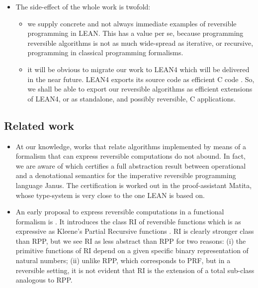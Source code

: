 \documentclass[runningheads]{llncs}
\newcommand{\RPP}{\textsf{RPP}\xspace}
\newcommand{\PRF}{\textsf{PRF}\xspace}
\newcommand{\CPP}{\textsf{C}\xspace}
\newcommand{\LEAN}{\textsf{LEAN}\xspace}
\newcommand{\LEANFour}{\textsf{LEAN4}\xspace}
\newcommand{\JMF}{\textsf{RI}\xspace} %
\newcommand{\Janus}{\textsf{Janus}\xspace}
\newcommand{\Matita}{\textsf{Matita}\xspace}
\begin{document}
\begin{itemize}
    \item The side-effect of the whole work is twofold:
    \begin{itemize}
        \item we supply concrete and not always immediate examples of reversible programming in \LEAN. This has a value per se, because programming reversible algorithms is not as much wide-spread as iterative, or recursive, programming in classical programming formalisms.
        \item it will be obvious to migrate our work to \LEANFour which will be delivered in the near future. \LEANFour exports its source code as efficient \CPP code \cite{2021-LEAN4-MouraUllrich}. So, we shall be able to export our reversible algorithms as efficient extensions of \LEANFour, or as standalone, and possibly reversible, \CPP applications.
    \end{itemize}
\end{itemize}

\subsection{Related work}
\begin{itemize}
\item
At our knowledge, works that relate algorithms implemented by means of a formalism that can express reversible computations do not abound. In fact, we are aware of \cite{paoliniTYPES2015} which certifies a full abstraction result between operational and a denotational semantics for the imperative reversible programming language \Janus \cite[Section 8.3.3]{perumalla2013chc}. The certification is worked out in the proof-assistant \Matita \cite{Asperti2007}, whose type-system is very close to the one \LEAN is based on.

\item
An early proposal to express reversible computations in a functional formalism is \cite{jacopini89tcs}. It introduces the class \JMF of reversible functions which is as expressive as Kleene's
Partial Recursive functions \cite{cutland1980book,odifreddi1989book}.
\JMF is clearly stronger class than \RPP, but we see \JMF as less abstract than \RPP for two reasons: (i) the primitive functions of \JMF depend on a given specific binary representation of natural numbers; (ii) unlike \RPP, which corresponds to \PRF, but in a reversible setting, it is not evident that \JMF is the extension of a total sub-class analogous to \RPP.
\end{itemize}
\end{document}
